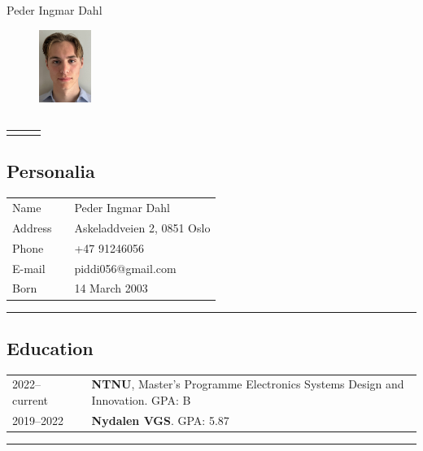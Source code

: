 \documentclass[10pt]{article}
\newlength{\cw}
\newlength{\cwl}
\begin{document}
\begin{center}
\Large{Peder Ingmar Dahl}
\end{center}



\begin{figure}
  \begin{center}
    \includegraphics[width=0.15\textwidth]{Vedlegg/cv_pp.png}
  \end{center}
\end{figure}

\subsection*{}
\begin{tabular}{p{\cw} @{ }l p{\cwl}}
 & & \\ 
\end{tabular}
\vspace{0.2cm}

\subsection*{Personalia}
\begin{tabular}{p{\cw} @{:}l p{\cwl}}
Name & & Peder Ingmar Dahl \\
Address & & Askeladdveien 2, 0851 Oslo\\
Phone & & +47 91246056\\ 
E-mail & & piddi056@gmail.com \\
Born & & 14 March 2003 
\end{tabular}
\vspace{0.1cm}
\hrule
\vspace{0.1cm}

\subsection*{Education}
\begin{tabular}{p{\cw} @{:}l p{\cwl}}
  2022--current & & \textbf{NTNU}, Master's Programme Electronics Systems Design and Innovation. GPA: B \\
  2019--2022 & & \textbf{Nydalen VGS}. GPA: 5.87 \\ 
\end{tabular}
\vspace{0.1cm}
\hrule
\vspace{0.1cm}
\end{document}
